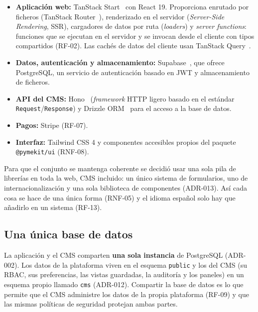 \begin{itemize}
  \item \textbf{Aplicación web:} TanStack Start~\cite{tanstack-start} con
        React 19. Proporciona enrutado por ficheros (TanStack
        Router~\cite{tanstack-router}), renderizado en el servidor
        (\textit{Server-Side Rendering}, SSR), cargadores de datos por ruta
        (\textit{loaders}) y \textit{server functions}: funciones que se
        ejecutan en el servidor y se invocan desde el cliente con tipos
        compartidos (RF-02). Las cachés de datos del cliente usan TanStack
        Query~\cite{tanstack-query}.
  \item \textbf{Datos, autenticación y almacenamiento:}
        Supabase~\cite{supabase-docs}, que ofrece PostgreSQL, un servicio de
        autenticación basado en JWT y almacenamiento de ficheros.
  \item \textbf{API del CMS:} Hono~\cite{hono} (\textit{framework} HTTP
        ligero basado en el estándar \texttt{Request}/\texttt{Response}) y
        Drizzle ORM~\cite{drizzle} para el acceso a la base de datos.
  \item \textbf{Pagos:} Stripe (RF-07). %
  \item \textbf{Interfaz:} Tailwind CSS 4 y componentes accesibles propios
        del paquete \texttt{@pymekit/ui} (RNF-08).
\end{itemize}

Para que el conjunto se mantenga coherente se decidió usar una sola pila de
librerías en toda la web, CMS incluido: un único sistema de formularios, uno
de internacionalización y una sola biblioteca de componentes (ADR-013). Así
cada cosa se hace de una única forma (RNF-05) y el idioma español solo hay que
añadirlo en un sistema (RF-13).

\subsection{Una única base de datos}

La aplicación y el CMS comparten \textbf{una sola instancia} de PostgreSQL
(ADR-002). Los datos de la plataforma viven en el esquema \texttt{public} y
los del CMS (su RBAC, sus preferencias, las vistas guardadas, la auditoría y
los paneles) en un esquema propio llamado \texttt{cms} (ADR-012). Compartir la
base de datos es lo que permite que el CMS administre los datos de la propia
plataforma (RF-09) y que las mismas políticas de seguridad protejan ambas
partes.

